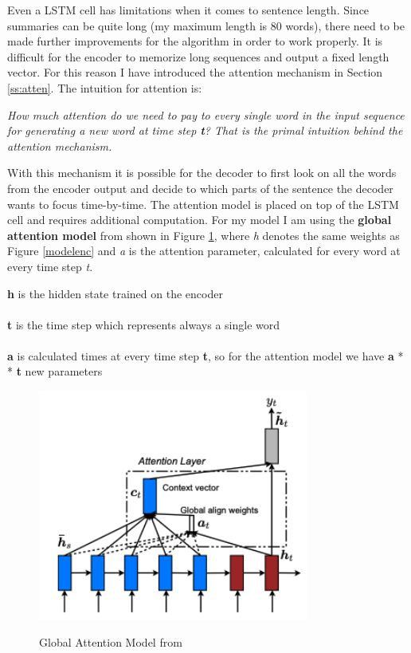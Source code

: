Even a LSTM cell has limitations when it comes to sentence length. Since summaries can be quite long (my maximum length is 80 words), there need to be made further improvements for the algorithm in order to work properly. It is difficult for the encoder to memorize long sequences and output a fixed length vector. For this reason I have introduced the attention mechanism in Section \ref{ss:atten}. The intuition for attention is:

\begin{tcolorbox}
	\textit{How much attention do we need to pay to every single word in the input sequence for generating a new word at time step \textbf{t}? That is the primal intuition behind the attention mechanism.}
\end{tcolorbox}

With this mechanism it is possible for the decoder to first look on all the words from the encoder output and decide to which parts of the sentence the decoder wants to focus time-by-time. The attention model is placed on top of the LSTM cell and requires additional computation. For my model I am using the \textbf{global attention model} from \cite{effectiveattn} shown in Figure \ref{glob}, where \textit{h} denotes the same weights as Figure \ref{modelenc} and \textit{a} is the attention parameter, calculated for every word at every time step \textit{t}.

\begin{tcolorbox}
	\textbf{h} is the hidden state trained on the encoder \\ \\
	\textbf{t} is the time step which represents always a single word \\ \\
	\textbf{a} is calculated  times at every time step \textbf{t}, so for the attention model we have \textbf{a} *  \textbf{t} new parameters
\end{tcolorbox}

\begin{figure}
	\begin{center}
		\includegraphics[width=3.5in]{photos/glob_att}\\
		\caption{Global Attention Model from \cite{effectiveattn}}\label{glob}
	\end{center}
\end{figure}

